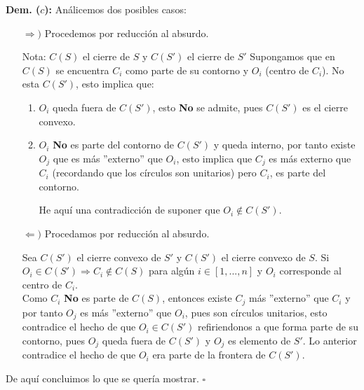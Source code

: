 \textbf{Dem. ($c$):} Análicemos dos posibles casos:
\begin{itemize}
\item[$\Rightarrow )$] Procedemos por reducción al absurdo.
  
 Nota: $C(S)$ el cierre de $S$ y $C(S')$ el cierre de $S'$
 Supongamos que en $C(S)$ se encuentra $C_i$ como parte de su contorno y $O_i$ 
 (centro de $C_i$). No esta $C(S')$, esto implica que:

 \begin{enumerate}
     \item $O_i$ queda fuera de $C(S')$, esto \textbf{No} se admite, pues $C(S')$
     es el cierre convexo.
     \item $O_i$ \textbf{No} es parte del contorno de $C(S')$ y queda interno, por tanto
     existe $O_j$ que es más ''externo'' que $O_i$, esto implica que $C_j$ es más externo
     que $C_i$ (recordando que los círculos son unitarios) pero $C_i$, es parte del contorno.
     
     He aquí una contradicción de suponer que $O_i\notin C(S')$.
 \end{enumerate}

\item[$\Leftarrow )$] Procedamos por reducción al absurdo.
  
Sea $C(S')$ el cierre convexo de $S'$ y $C(S')$ el cierre convexo de $S$. 
Si $O_i\in C(S')\Rightarrow C_i\notin C(S)$ para algún $i\in [1,...,n]$ y 
$O_i$ corresponde al centro de $C_i$.\\

Como $C_i$ \textbf{No} es parte de $C(S)$, entonces existe $C_j$ más ''externo'' que 
$C_i$ y por tanto $O_j$ es más ''externo'' que $O_i$, pues son círculos unitarios, 
esto contradice el hecho de que $O_i\in C(S')$ refiriendonos a que forma parte de su 
contorno, pues $O_j$ queda fuera de $C(S')$ y $O_j$ es elemento de $S'$. Lo anterior contradice
el hecho de que $O_i$ era parte de la frontera de $C(S').$\\
\end{itemize}
De aquí concluimos lo que se quería mostrar. \hfill $\square$
\newline

